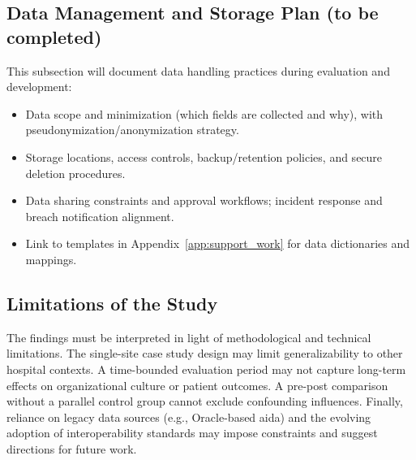 \subsection{Data Management and Storage Plan (to be completed)}
\begingroup\sloppy
This subsection will document data handling practices during evaluation and development:
\begin{itemize}
    \item Data scope and minimization (which fields are collected and why), with pseudonymization/anonymization strategy.
    \item Storage locations, access controls, backup/retention policies, and secure deletion procedures.
    \item Data sharing constraints and approval workflows; incident response and breach notification alignment.
    \item Link to templates in Appendix~\ref{app:support_work} for data dictionaries and mappings.
\end{itemize}
\endgroup

\subsection{Limitations of the Study}
The findings must be interpreted in light of methodological and technical limitations. The single-site case study design may limit generalizability to other hospital contexts. A time-bounded evaluation period may not capture long-term effects on organizational culture or patient outcomes. A pre-post comparison without a parallel control group cannot exclude confounding influences. Finally, reliance on legacy data sources (e.g., Oracle-based \gls{aida}) and the evolving adoption of interoperability standards may impose constraints and suggest directions for future work.


